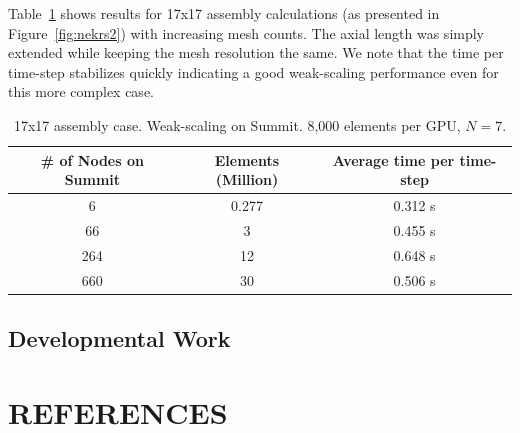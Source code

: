 Table~\ref{wscaling2} shows results for 17x17 assembly calculations (as presented in Figure~\ref{fig:nekrs2}) with increasing mesh counts. The axial length was simply extended while keeping the mesh resolution the same. We note that the time per time-step stabilizes quickly indicating a good weak-scaling performance even for this more complex case.

\begin{table} [!h]
\begin{center} \begin{tabular}{ccc}
 \hline
\# of Nodes on Summit & Elements (Million) &  Average time per time-step \\
 \hline
6	  & 0.277	& 0.312 s \\
66    & 3  	    & 0.455 s \\
264   & 12	    & 0.648 s \\
660   & 30	    & 0.506 s \\
\hline
\end{tabular} \end{center}
\caption{\label{wscaling2} 17x17 assembly case. Weak-scaling on Summit. 8,000 elements per GPU, $N=7$.}
\end{table}

\vspace{-.25in}
\subsection{Developmental Work}
\vspace{-.2in}


\vspace{-.15in}
\section{REFERENCES}
\vspace{-.15in}



\renewcommand{\section}[2]{}%






